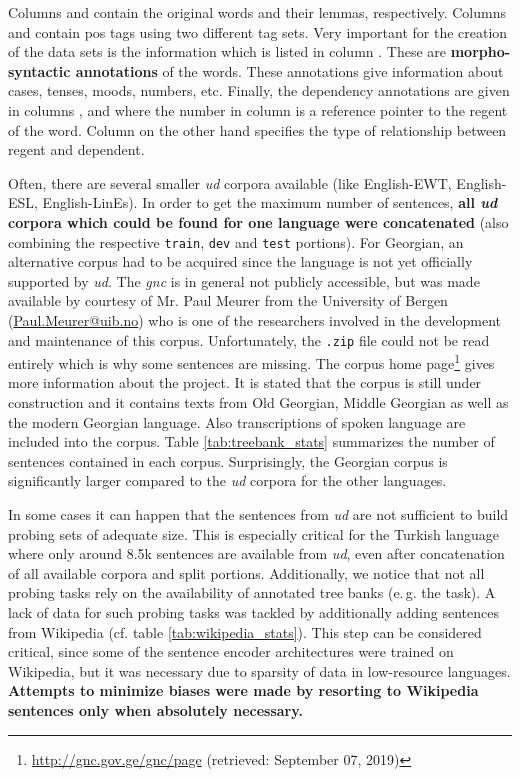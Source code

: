 Columns  and  contain the original words and their lemmas, respectively. Columns  and  contain \gls{pos} tags using two different tag sets. Very important for the creation of the data sets is the information which is listed in column . These are \textbf{morpho-syntactic annotations} of the words. These annotations give information about cases, tenses, moods, numbers, etc. Finally, the dependency annotations are given in columns ,  and  where the number in column  is a reference pointer to the regent of the word. Column  on the other hand specifies the type of relationship between regent and dependent. 

Often, there are several smaller \textit{\gls{ud}} corpora available (like English-EWT, English-ESL, English-LinEs). In order to get the maximum number of sentences, \textbf{all \textit{\gls{ud}} corpora which could be found for one language were concatenated} (also combining the respective \texttt{train}, \texttt{dev} and \texttt{test} portions). For Georgian, an alternative corpus had to be acquired since the language is not yet officially supported by \textit{\gls{ud}}. The \textit{\gls{gnc}} is in general not publicly accessible, but was made available by courtesy of Mr. Paul Meurer from the University of Bergen (\url{Paul.Meurer@uib.no}) who is one of the researchers involved in the development and maintenance of this corpus. Unfortunately, the \texttt{.zip} file could not be read entirely which is why some sentences are missing. The corpus home page\footnote{\url{http://gnc.gov.ge/gnc/page} (retrieved: September 07, 2019)} gives more information about the project. It is stated that the corpus is still under construction and it contains texts from Old Georgian, Middle Georgian as well as the modern Georgian language. Also transcriptions of spoken language are included into the corpus. Table \vref{tab:treebank_stats} summarizes the number of sentences contained in each corpus. Surprisingly, the Georgian corpus is significantly larger compared to the \textit{\gls{ud}} corpora for the other languages.


\vspace*{-5mm}

In some cases it can happen that the sentences from \textit{\gls{ud}} are not sufficient to build probing sets of adequate size. This is especially critical for the Turkish language where only around 8.5k sentences are available from \textit{\gls{ud}}, even after concatenation of all available corpora and split portions. Additionally, we notice that not all probing tasks rely on the availability of annotated tree banks (e.\,g. the  task). A lack of data for such probing tasks was tackled by additionally adding sentences from Wikipedia (cf. table \vref{tab:wikipedia_stats}). This step can be considered critical, since some of the sentence encoder architectures were trained on Wikipedia, but it was necessary due to sparsity of data in low-resource languages. \textbf{Attempts to minimize biases were made by resorting to Wikipedia sentences only when absolutely necessary.}

